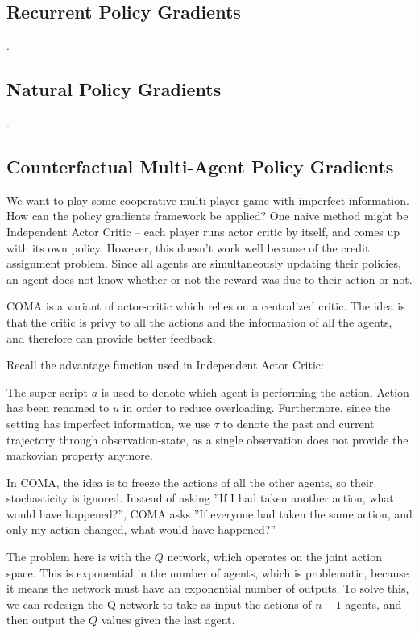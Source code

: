 \documentclass[12pt]{article}
\begin{document}
\subsection{Recurrent Policy Gradients}
.
\subsection{Natural Policy Gradients}
.
\subsection{Counterfactual Multi-Agent Policy Gradients}

We want to play some cooperative multi-player game with imperfect information. How can the policy gradients framework be applied? One naive method might be Independent Actor Critic -- each player runs actor critic by itself, and comes up with its own policy. However, this doesn't work well because of the credit assignment problem. Since all agents are simultaneously updating their policies, an agent does not know whether or not the reward was due to their action or not.

COMA is a variant of actor-critic which relies on a centralized critic. The idea is that the critic is privy to all the actions and the information of all the agents, and therefore can provide better feedback. 

Recall the advantage function used in Independent Actor Critic:


The super-script $a$ is used to denote which agent is performing the action. Action has been renamed to $u$ in order to reduce overloading. Furthermore, since the setting has imperfect information, we use $\tau$ to denote the past and current trajectory through observation-state, as a single observation does not provide the markovian property anymore.

In COMA, the idea is to freeze the actions of all the other agents, so their stochasticity is ignored. Instead of asking ''If I had taken another action, what would have happened?'', COMA asks ''If everyone had taken the same action, and only my action changed, what would have happened?''


The problem here is with the $Q$ network, which operates on the joint action space. This is exponential in the number of agents, which is problematic, because it means the network must have an exponential number of outputs. To solve this, we can redesign the Q-network to take as input the actions of $n-1$ agents, and then output the $Q$ values given the last agent. 
\end{document}
